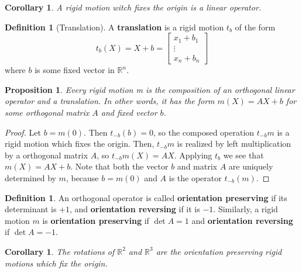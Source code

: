 \documentclass[12pt]{article}
\newtheorem{cor}[thm]{Corollary}
\newtheorem{prop}[thm]{Proposition}
\theoremstyle{definition}
\newtheorem{defn}[thm]{Definition}
\theoremstyle{remark}
\numberwithin{equation}{section}
\newcommand\R{\mathbb R}    %
\newcommand\B[1]{\textbf{ #1}}
\begin{document}
\vspace{15pt}

\begin{cor}
        A rigid motion witch fixes the origin is a linear operator.
\end{cor}

\vspace{15pt}


\begin{defn}[Translation]
        A \B{translation} is a rigid motion $t_b$ of the form \begin{equation}
                t_b(X) = X + b = \begin{bmatrix} x_1 + b_1 \\ \vdots \\ x_n + b_n \end{bmatrix}
        \end{equation}
        where $b$ is some fixed vector in $\R^n$.
\end{defn}

\vspace{15pt}

\begin{prop}
        Every rigid motion m is the composition of an orthogonal linear operator and a translation. In other words, it has the form $m(X) = AX + b$ for some orthogonal matrix $A$ and fixed vector $b$.
\end{prop}
\begin{proof}
        Let $b = m(0)$. Then $t_{-b}(b) = 0$, so the composed operation $t_{-b}m$ is a rigid motion which fixes the origin. Then, $t_{-b}m$ is realized by left multiplication by a orthogonal matrix $A$, so $t_{-b}m(X) = AX$. Applying $t_b$ we see that $m(X) = AX + b$. Note that both the vector $b$ and matrix $A$ are uniquely determined by $m$, because $b = m(0)$ and $A$ is the operator $t_{-b}(m)$.
\end{proof}

\vspace{15pt}

\begin{defn}
        An orthogonal operator is called \B{orientation preserving} if its determinant is $+1$, and \B{orientation reversing} if it is $-1$. Similarly, a rigid motion $m$ is \B{orientation preserving} if $\det A = 1$ and \B{orientation reversing} if $\det A = -1$.
\end{defn}

\vspace{15pt}

\begin{cor}
        The rotations of $\R^2$ and $\R^3$ are the orientation preserving rigid motions which fix the origin.
\end{cor}
\end{document}
